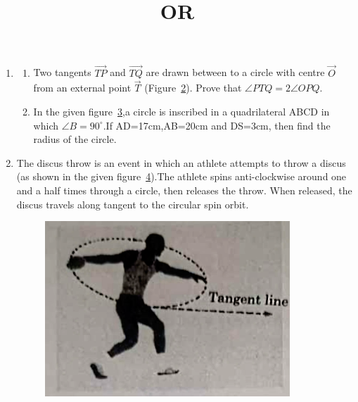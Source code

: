 \documentclass[12pt,A4 paper]{article}
\begin{document}
\begin{enumerate}
\begin{figure}[h]
	        \centering
	        
		\caption{}
		\label{fig:4}
        \end{figure}


\begin{figure}[h]
	        \centering
	        
        \end{figure}


\pagebreak
\item
  \begin{enumerate}
	  \item Two tangents $\overrightarrow{TP}$ and $\overrightarrow{TQ}$ are drawn between to a circle with centre $\vec{O}$ from an external point $\vec{T}$ (Figure~\ref{fig:5}). Prove that $\angle PTQ = 2 \angle OPQ$.\\
\begin{figure}[h]
	        \centering
	        
		\caption{}
		\label{fig:5}
        \end{figure}



\begin{center}
    \title{OR}
\end{center}
\item In the given figure~\ref{fig:6},a circle is inscribed in a quadrilateral ABCD in which $\angle B =90 ^{\circ}$.If AD=17cm,AB=20cm and DS=3cm, then find the radius of the circle.

\begin{figure}[h]
	        \centering
	        
		\caption{}
		\label{fig:6}
\end{figure}
   \end{enumerate}




\item The discus throw is an event in which an athlete attempts to throw a discus (as shown in the given figure~\ref{fig:0}).The athlete spins anti-clockwise around one and a half times through a circle, then releases the throw. When released, the discus travels along tangent to the circular spin orbit.


\begin{figure}[ht]	

	        \centering
		\includegraphics[width=0.7\columnwidth]{image/fig0.png}
		\caption{}
		\label{fig:0}
\end{figure}
\pagebreak


\end{enumerate}
\end{document}
